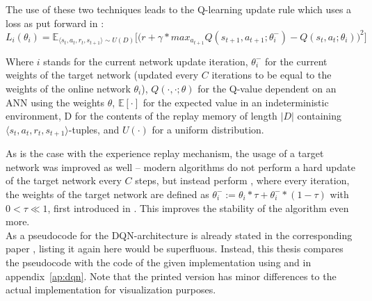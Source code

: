 \noindent The use of these two techniques leads to the Q-learning update rule which uses a loss as put forward in \cite{mnih_human-level_2015}:
\begin{equation} \label{qloss_target}
	L_i(\theta_i) = \mathds{E}_{\langle s_t,a_t,r_t,s_{t+1} \rangle \sim U(D)} \Bigg[\Big( r + \gamma * max_{a_{t+1}} Q(s_{t+1}, a_{t+1}; \theta^-_i) - Q(s_t,a_t;\theta_i) \Big)^2\Bigg]
\end{equation}
\begin{flushright}
	\small
	Where $i$ stands for the current network update iteration, $\theta_i^-$ for the current weights of the target network (updated every $C$ iterations to be equal to the weights of the online network $\theta_i$), $Q(\cdot,\cdot;\theta)$ for the Q-value dependent on an ANN using the weights $\theta$, $\mathds{E}[\cdot]$ for the expected value in an indeterministic environment, D for the contents of the replay memory of length $\lvert D \rvert$ containing $\langle s_t,a_t,r_t,s_{t+1} \rangle$-tuples, and $U(\cdot)$ for a uniform distribution.
\end{flushright}
As is the case with the experience replay mechanism, the usage of a target network was improved as well -- modern algorithms do not perform a hard update of the target network every $C$ steps, but instead perform , where every iteration, the weights of the target network are defined as $\theta^-_i := \theta_i * \tau + \theta^-_i * (1-\tau)$ with $0 < \tau \ll 1$, first introduced in \cite{lillicrap_continuous_2015}. This improves the stability of the algorithm even more.\\

As a pseudocode for the DQN-architecture is already stated in the corresponding paper \cite{mnih_human-level_2015}, listing it again here would be superfluous. Instead, this thesis compares the pseudocode with the code of the given implementation using  and  in appendix~\ref{ap:dqn}. Note that the printed version has minor differences to the actual implementation for visualization purposes.

